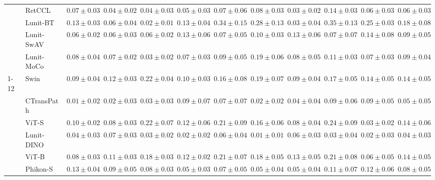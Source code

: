 \begin{tabular}{ll|cccc|c|cccc|c}
 & RetCCL~\cite{wang2023retccl} & $0.07 \pm 0.03$ & $0.04 \pm 0.02$ & $0.04 \pm 0.03$ & $0.05 \pm 0.03$ & $0.07 \pm 0.06$ & $0.08 \pm 0.03$ & $\mathbf{0.03 \pm 0.02}$ & $0.14 \pm 0.03$ & $0.06 \pm 0.03$ & $0.06 \pm 0.03$ \\
 & Lunit-BT~\cite{kang2023benchmarking} & $0.13 \pm 0.03$ & $0.06 \pm 0.04$ & $0.02 \pm 0.01$ & $0.13 \pm 0.04$ & $0.34 \pm 0.15$ & $0.28 \pm 0.13$ & $0.03 \pm 0.04$ & $0.35 \pm 0.13$ & $0.25 \pm 0.03$ & $0.18 \pm 0.08$ \\
 & Lunit-SwAV~\cite{kang2023benchmarking} & $0.06 \pm 0.02$ & $0.06 \pm 0.03$ & $0.06 \pm 0.02$ & $0.13 \pm 0.06$ & $0.07 \pm 0.05$ & $0.10 \pm 0.03$ & $0.13 \pm 0.06$ & $0.07 \pm 0.07$ & $0.14 \pm 0.08$ & $0.09 \pm 0.05$ \\
 & Lunit-MoCo~\cite{kang2023benchmarking} & $0.08 \pm 0.04$ & $0.07 \pm 0.02$ & $0.03 \pm 0.02$ & $0.07 \pm 0.03$ & $0.09 \pm 0.05$ & $0.19 \pm 0.06$ & $0.08 \pm 0.05$ & $0.11 \pm 0.03$ & $0.07 \pm 0.03$ & $0.09 \pm 0.04$ \\
\cline{1-12}
\multirow[t]{12}{*}{Transformer} & Swin~\cite{liu2021swin} & $0.09 \pm 0.04$ & $0.12 \pm 0.03$ & $0.22 \pm 0.04$ & $0.10 \pm 0.03$ & $0.16 \pm 0.08$ & $0.19 \pm 0.07$ & $0.09 \pm 0.04$ & $0.17 \pm 0.05$ & $0.14 \pm 0.05$ & $0.14 \pm 0.05$ \\
 & CTransPath~\cite{wang2022transformer} & $\mathbf{0.01 \pm 0.02}$ & $\mathbf{0.02 \pm 0.03}$ & $0.03 \pm 0.03$ & $0.09 \pm 0.07$ & $0.07 \pm 0.07$ & $0.02 \pm 0.02$ & $0.04 \pm 0.04$ & $0.09 \pm 0.06$ & $0.09 \pm 0.05$ & $0.05 \pm 0.05$ \\
 & ViT-S~\cite{kolesnikov2021image} & $0.10 \pm 0.02$ & $0.08 \pm 0.03$ & $0.22 \pm 0.07$ & $0.12 \pm 0.06$ & $0.21 \pm 0.09$ & $0.16 \pm 0.06$ & $0.08 \pm 0.04$ & $0.24 \pm 0.09$ & $0.03 \pm 0.02$ & $0.14 \pm 0.06$ \\
 & Lunit-DINO~\cite{kang2023benchmarking} & $0.04 \pm 0.03$ & $0.07 \pm 0.03$ & $0.03 \pm 0.02$ & $\mathbf{0.02 \pm 0.02}$ & $\mathbf{0.06 \pm 0.04}$ & $\mathbf{0.01 \pm 0.01}$ & $0.06 \pm 0.03$ & $\mathbf{0.03 \pm 0.04}$ & $\mathbf{0.02 \pm 0.03}$ & $\mathbf{0.04 \pm 0.03}$ \\
 & ViT-B~\cite{kolesnikov2021image} & $0.08 \pm 0.03$ & $0.11 \pm 0.03$ & $0.18 \pm 0.03$ & $0.12 \pm 0.02$ & $0.21 \pm 0.07$ & $0.18 \pm 0.05$ & $0.13 \pm 0.05$ & $0.21 \pm 0.08$ & $0.06 \pm 0.05$ & $0.14 \pm 0.05$ \\
 & Phikon-S~\cite{filiot2023scaling} & $0.13 \pm 0.04$ & $0.09 \pm 0.05$ & $0.08 \pm 0.03$ & $0.05 \pm 0.03$ & $0.07 \pm 0.05$ & $0.05 \pm 0.04$ & $0.05 \pm 0.04$ & $0.11 \pm 0.07$ & $0.12 \pm 0.06$ & $0.08 \pm 0.05$ \\

\end{tabular}
